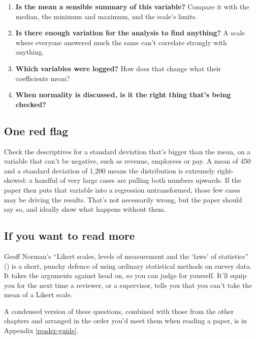 \documentclass[
]{book}
\providecommand{\tightlist}{%
  \setlength{\itemsep}{0pt}\setlength{\parskip}{0pt}}
\begin{document}
\begin{enumerate}
\def\labelenumi{\arabic{enumi}.}
\tightlist
\item
  \textbf{Is the mean a sensible summary of this variable?} Compare it with the median, the minimum and maximum, and the scale's limits.
\item
  \textbf{Is there enough variation for the analysis to find anything?} A scale where everyone answered much the same can't correlate strongly with anything.
\item
  \textbf{Which variables were logged?} How does that change what their coefficients mean?
\item
  \textbf{When normality is discussed, is it the right thing that's being checked?}
\end{enumerate}

\subsection{One red flag}\label{one-red-flag-1}

Check the descriptives for a standard deviation that's bigger than the mean, on a variable that can't be negative, such as revenue, employees or pay. A mean of 450 and a standard deviation of 1,200 means the distribution is extremely right-skewed: a handful of very large cases are pulling both numbers upwards. If the paper then puts that variable into a regression untransformed, those few cases may be driving the results. That's not necessarily wrong, but the paper should say so, and ideally show what happens without them.

\subsection{If you want to read more}\label{if-you-want-to-read-more-1}

Geoff Norman's ``Likert scales, levels of measurement and the `laws' of statistics'' () is a short, punchy defence of using ordinary statistical methods on survey data. It takes the arguments against head on, so you can judge for yourself. It'll equip you for the next time a reviewer, or a supervisor, tells you that you can't take the mean of a Likert scale.

A condensed version of these questions, combined with those from the other chapters and arranged in the order you'd meet them when reading a paper, is in Appendix \ref{reader-guide}.
\end{document}
